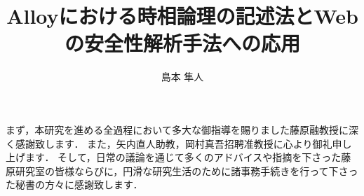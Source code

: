 \documentclass[12pt,a4paper]{jbook}
\title{Alloyにおける時相論理の記述法とWebの安全性解析手法への応用}
\author{島本 隼人}
\begin{document}
\coverpage
\tableofcontents
\listoffigures
\listoftables
\body

 \clearpage
 \clearpage
 \clearpage
 \clearpage
 \clearpage
 \clearpage
 \clearpage


\acknowledgement
まず，本研究を進める全過程において多大な御指導を賜りました藤原融教授に深く感謝致します．
また，矢内直人助教，岡村真吾招聘准教授に心より御礼申し上げます．
そして，日常の議論を通じて多くのアドバイスや指摘を下さった藤原研究室の皆様ならびに，円滑な研究生活のために諸事務手続きを行って下さった秘書の方々に感謝致します．





\end{document}
